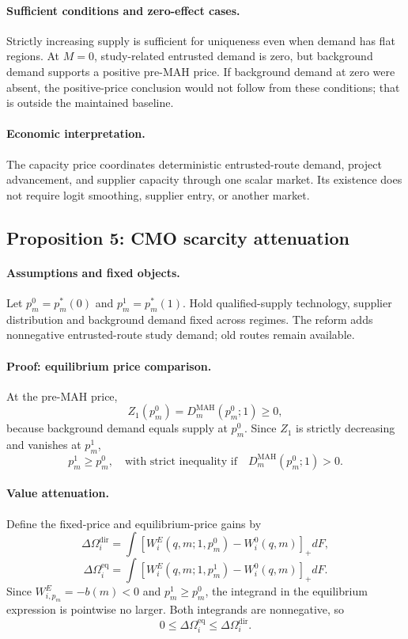 \paragraph{Sufficient conditions and zero-effect cases.}
Strictly increasing supply is sufficient for uniqueness even when demand has
flat regions. At \(M=0\), study-related entrusted demand is zero, but
background demand supports a positive pre-MAH price. If background demand at
zero were absent, the positive-price conclusion would not follow from these
conditions; that is outside the maintained baseline.

\paragraph{Economic interpretation.}
The capacity price coordinates deterministic entrusted-route demand,
project advancement, and supplier capacity through one scalar market. Its
existence does not require logit smoothing, supplier entry, or another market.

\subsection{Proposition 5: CMO scarcity attenuation}
\label{prop:p08-scarcity}

\paragraph{Assumptions and fixed objects.}
Let \(p_m^0=p_m^*(0)\) and \(p_m^1=p_m^*(1)\). Hold qualified-supply
technology, supplier distribution and background demand fixed across regimes.
The reform adds nonnegative entrusted-route study demand; old routes remain
available.

\paragraph{Proof: equilibrium price comparison.}
At the pre-MAH price,
\[
  Z_1(p_m^0)
  =
  D_m^{\mathrm{MAH}}(p_m^0;1)
  \geq0,
\]
because background demand equals supply at \(p_m^0\). Since \(Z_1\) is
strictly decreasing and vanishes at \(p_m^1\),
\begin{equation}
  p_m^1\geq p_m^0,
  \quad\text{with strict inequality if}\quad
  D_m^{\mathrm{MAH}}(p_m^0;1)>0.
  \label{eq:p08-price-order}
\end{equation}

\paragraph{Value attenuation.}
Define the fixed-price and equilibrium-price gains by
\[
  \Delta\Omega_i^{\mathrm{dir}}
  =
  \int
  [W_i^E(q,m;1,p_m^0)-W_i^0(q,m)]_+
  dF,
\]
\[
  \Delta\Omega_i^{\mathrm{eq}}
  =
  \int
  [W_i^E(q,m;1,p_m^1)-W_i^0(q,m)]_+
  dF.
\]
Since \(W_{i,p_m}^E=-b(m)<0\) and
\(p_m^1\geq p_m^0\), the integrand in the equilibrium expression is
pointwise no larger. Both integrands are nonnegative, so
\begin{equation}
  0
  \leq
  \Delta\Omega_i^{\mathrm{eq}}
  \leq
  \Delta\Omega_i^{\mathrm{dir}}.
  \label{eq:p08-scarcity-value-bounds}
\end{equation}

